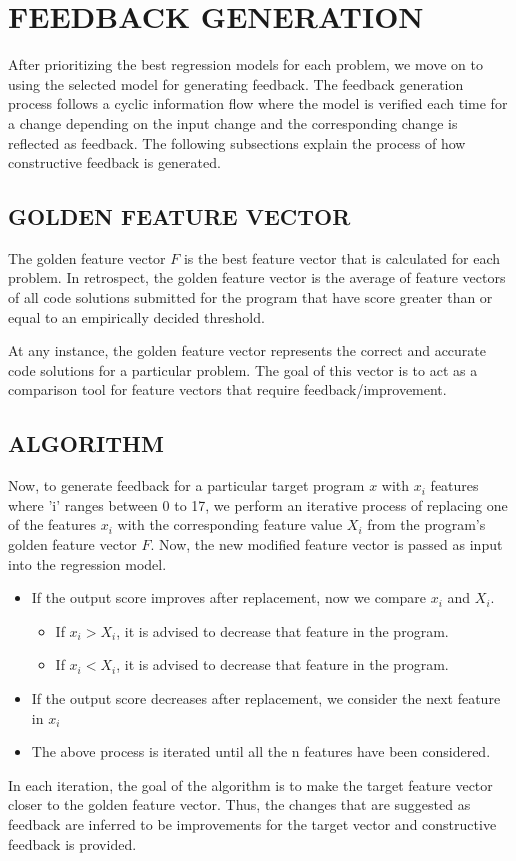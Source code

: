 
\chapter{FEEDBACK GENERATION}

After prioritizing the best regression models for each problem, we
move on to using the selected model for generating feedback. The
feedback generation process follows a cyclic information flow where
the model is verified each time for a change depending on the input
change and the corresponding change is reflected as feedback. The
following subsections explain the process of how constructive feedback
is generated.

\section{GOLDEN FEATURE VECTOR}

The golden feature vector $F$ is the best feature vector that is
calculated for each problem. In retrospect, the golden feature vector
is the average of feature vectors of all code solutions submitted for
the program that have score greater than or equal to an empirically
decided threshold.

At any instance, the golden feature vector represents the correct and
accurate code solutions for a particular problem. The goal of this
vector is to act as a comparison tool for feature vectors that require
feedback/improvement.

\section{ALGORITHM}

Now, to generate feedback for a particular target program $x$ with
$x_{i}$ features where 'i' ranges between 0 to 17, we perform an iterative process of replacing one of the
features $x_{i}$ with the corresponding feature value $X_{i}$ from the
program's golden feature vector $F$. Now, the new modified feature
vector is passed as input into the regression model.

\begin{itemize}
\item If the output score improves after replacement, now we compare
  $x_{i}$ and $X_{i}$.
  \begin{itemize}
  \item If $x_{i} > X_{i}$, it is advised to decrease that feature in the program.
  \item If $x_{i}<X_{i}$, it is advised to decrease that feature in the program.
  \end{itemize}
\item If the output score decreases after replacement, we consider the
  next feature in $x_{i}$
\item The above process is iterated until all the n features have been
  considered.
\end{itemize}

In each iteration, the goal of the algorithm is to make the target
feature vector closer to the golden feature vector. Thus, the changes
that are suggested as feedback are inferred to be improvements
for the target vector and constructive feedback is provided.

